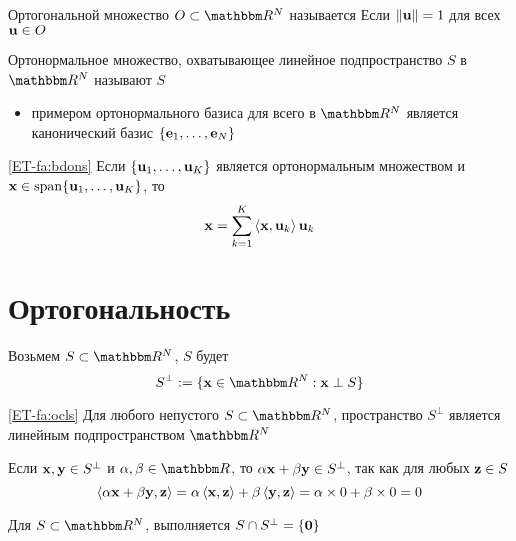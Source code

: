 \begin{frame}
    
    \vspace{2em}
    Ортогональной множество $O \subset \RR^N$ называется  
    Если $\|{\mathbf u} \| = 1$ для всех ${\mathbf u} \in O$

    Ортонормальное множество, охватывающее линейное подпространство
    $S$ в $\RR^N$ называют  $S$
    
    \begin{itemize}
        \item примером ортонормального базиса для всего в $\RR^N$ является
        канонический базис $\{{\mathbf e}_1, \ldots, {\mathbf e}_N\}$
    \end{itemize}
    
    \vspace{1em}
    \Fact\eqref{ET-fa:bdons}
    Если $\{{\mathbf u}_1, \ldots, {\mathbf u}_K\}$ является ортонормальным множеством
    и ${\mathbf x} \in \operatorname{span}\{{\mathbf u}_1, \ldots, {\mathbf u}_K\}$, то
    \begin{equation*}
        \label{eq:exbyob}
        {\mathbf x} = \sum_{k=1}^K \left\langle{ {\mathbf x} ,  {\mathbf u} _k}\right\rangle {\mathbf u}_k
    \end{equation*}
\end{frame}

\section{Ортогональность}

\begin{frame}
    
    \vspace{2em}
    Возьмем $S \subset \RR^N$, 
    $S$ будет
    \begin{equation*}
        S^{\perp} := \setntn{\boldx \in \RR^N}{\boldx \perp S}
    \end{equation*}
    
    \vspace{.5em}
    \Fact\eqref{ET-fa:ocls}
    Для любого непустого $S \subset \RR^N$, пространство $S^{\perp}$ является
    линейным подпространством $\RR^N$
    
    \Prf 
    Если ${\mathbf x}, {\mathbf y} \in S^{\perp}$ и $\alpha, \beta \in \RR$, то 
    $\alpha {\mathbf x} + \beta {\mathbf y} \in S^{\perp}$, 
    так как для любых ${\mathbf z} \in S$
    \begin{equation*}
        \left\langle{\alpha  {\mathbf x} + \beta  {\mathbf y} ,  {\mathbf z} }\right\rangle
         = \alpha \left\langle{  {\mathbf x} ,  {\mathbf z} }\right\rangle + \beta \left\langle{ {\mathbf y} ,  {\mathbf z} }\right\rangle
         = \alpha \times 0  + \beta \times 0 
         = 0
    \end{equation*}
    
    \vspace{.5em}
    \Fact{\eqref{ET-fa:scscez}}
    Для $S \subset \RR^N$, выполняется $S \cap S^{\perp} =
    \{{\mathbf 0}\}$
    
\end{frame}
   
